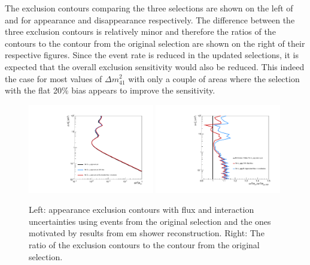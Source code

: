 The exclusion contours comparing the three selections are shown on the left of  and  for \nue appearance and disappearance respectively. The difference between the three exclusion contours is relatively minor and therefore the ratios of the contours to the contour from the original selection are shown on the right of their respective figures. Since the event rate is reduced in the updated selections, it is expected that the overall exclusion sensitivity would also be reduced. This indeed the case for most values of $\Delta m^2_{41}$ with only a couple of areas where the selection with the flat 20\% bias appears to improve the sensitivity.

\begin{figure}[h!]
    \centering
    \includegraphics[width = 0.49\textwidth]{figures-chap6/exclusion_contours/bias/nue_app_03d1.pdf}
    \includegraphics[width = 0.49\textwidth]{figures-chap6/exclusion_contours/bias/nue_app_03d1_ratio.pdf}
    \caption[\nue appearance exclusion contours using events from the selection motivated by \gls{em} shower reconstruction.]{Left: \nue appearance exclusion contours with flux and interaction uncertainties using events from the original selection and the ones motivated by results from \gls{em} shower reconstruction. Right: The ratio of the exclusion contours to the contour from the original selection.}
    \label{fig:nue_app_bias}
\end{figure}


